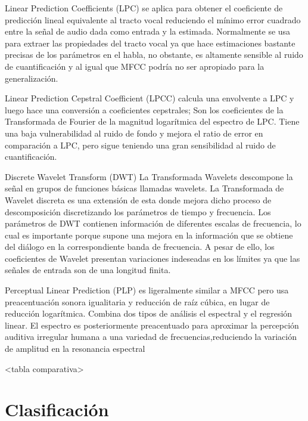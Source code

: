 \documentclass[11pt,a4paper,spanish]{book}
\begin{document}
		Linear Prediction Coefficients (LPC) se aplica para obtener el coeficiente de predicción lineal equivalente al tracto vocal reduciendo el mínimo error cuadrado entre la señal de audio dada como entrada y la estimada. Normalmente se usa para extraer las propiedades del tracto vocal ya que hace estimaciones bastante precisas de los parámetros en el habla, no obstante, es altamente sensible al ruido de cuantificación y al igual que MFCC podría no ser apropiado para la generalización.
		
		Linear Prediction Cepstral Coefficient (LPCC) calcula una envolvente a LPC y luego hace una conversión a coeficientes cepstrales; Son los coeficientes de la Transformada de Fourier de la magnitud logarítmica del espectro de LPC. Tiene una baja vulnerabilidad al ruido de fondo y mejora el ratio de error en comparación a LPC, pero sigue teniendo una gran sensibilidad al ruido de cuantificación.
		
		Discrete Wavelet Transform (DWT) La Transformada Wavelets descompone la señal en grupos de funciones básicas llamadas wavelets. La Transformada de Wavelet discreta es una extensión de esta donde mejora dicho proceso de descomposición discretizando los parámetros de tiempo y frecuencia. Los parámetros de DWT contienen información de diferentes escalas de frecuencia, lo cual es importante porque supone una mejora en la información que se obtiene del diálogo en la correspondiente banda de frecuencia. A pesar de ello, los coeficientes de Wavelet presentan variaciones indeseadas en los límites ya que las señales de entrada son de una longitud finita.
		
		Perceptual Linear Prediction (PLP) es ligeralmente similar a MFCC pero usa preacentuación sonora igualitaria y reducción de raíz cúbica, en lugar de reducción logarítmica. Combina dos tipos de análisis el espectral y el regresión linear. El espectro es posteriormente preacentuado para aproximar la percepción auditiva irregular humana a una variedad de frecuencias,reduciendo la variación de amplitud en la resonancia espectral
		
		<tabla comparativa>
		
		\section{Clasificación}
		\printbibliography
	
\end{document}
